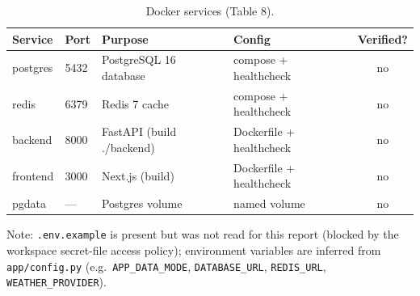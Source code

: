 \documentclass[11pt,a4paper]{article}
\newcommand{\no}{\textcolor{cmiss}{no}}
\newcommand{\code}[1]{\texttt{\small #1}}
\begin{document}
\begin{table}[H]
\centering
\caption{Docker services (Table 8).}
\label{tab:docker}
\footnotesize
\begin{tabular}{@{}l l p{3.6cm}p{2.8cm}c@{}}
\toprule
\textbf{Service} & \textbf{Port} & \textbf{Purpose} & \textbf{Config} & \textbf{Verified?}\\
\midrule
postgres & 5432 & PostgreSQL 16 database & compose + healthcheck & \no\\
redis & 6379 & Redis 7 cache & compose + healthcheck & \no\\
backend & 8000 & FastAPI (build ./backend) & Dockerfile + healthcheck & \no\\
frontend & 3000 & Next.js (build) & Dockerfile + healthcheck & \no\\
pgdata & --- & Postgres volume & named volume & \no\\
\bottomrule
\end{tabular}
\end{table}

\noindent Note: \code{.env.example} is present but was not read for this report (blocked
by the workspace secret-file access policy); environment variables are inferred from
\code{app/config.py} (e.g.\ \code{APP\_DATA\_MODE}, \code{DATABASE\_URL},
\code{REDIS\_URL}, \code{WEATHER\_PROVIDER}).

\end{document}
